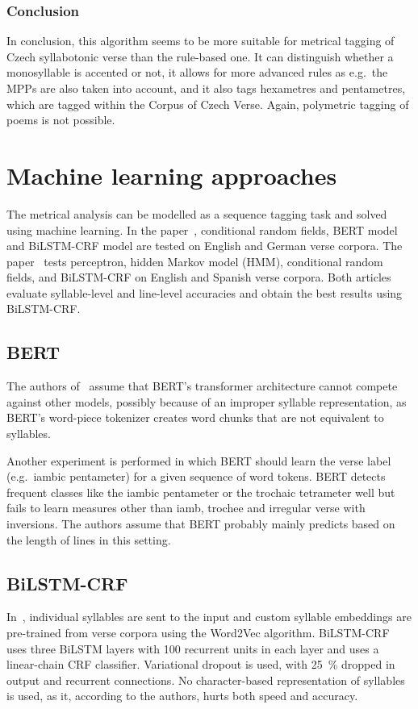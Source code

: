 \subsubsection{Conclusion}
In conclusion, this algorithm seems to be more suitable for metrical tagging of Czech syllabotonic verse than the rule-based one. It can distinguish whether a monosyllable is accented or not, it allows for more advanced rules as e.g.~the MPPs are also taken into account, and it also tags hexametres and pentametres, which are tagged within the Corpus of Czech Verse. Again, polymetric tagging of poems is not possible.

\section{Machine learning approaches}\label{section:ml-approaches}
The metrical analysis can be modelled as a sequence tagging task and solved using machine learning. In the paper~\cite{MetricalTaggingInTheWild}, conditional random fields, BERT model and BiLSTM-CRF model are tested on English and German verse corpora. The paper~\cite{ComparisonFeatureBasedNeualScansion} tests perceptron, hidden Markov model (HMM), conditional random fields, and BiLSTM-CRF on English and Spanish verse corpora. Both articles evaluate syllable-level and line-level accuracies and obtain the best results using BiLSTM-CRF.

\subsection{BERT}
The authors of~\cite{MetricalTaggingInTheWild} assume that BERT's transformer architecture cannot compete against other models, possibly because of an improper syllable representation, as BERT's word-piece tokenizer creates word chunks that are not equivalent to syllables.

Another experiment is performed in which BERT should learn the verse label (e.g.~iambic pentameter) for a given sequence of word tokens. BERT detects frequent classes like the iambic pentameter or the trochaic tetrameter well but fails to learn measures other than iamb, trochee and irregular verse with inversions. The authors assume that BERT probably mainly predicts based on the length of lines in this setting.

\subsection{BiLSTM-CRF}
In~\cite{MetricalTaggingInTheWild}, individual syllables are sent to the input and custom syllable embeddings are pre-trained from verse corpora using the Word2Vec algorithm. BiLSTM-CRF uses three BiLSTM layers with 100 recurrent units in each layer and uses a linear-chain CRF classifier. Variational dropout is used, with 25~\% dropped in output and recurrent connections. No character-based representation of syllables is used, as it, according to the authors, hurts both speed and accuracy.

